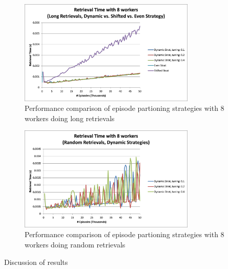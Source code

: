 \documentclass[11pt]{article} %
\begin{document}
\begin{figure}[h]
\caption{Performance comparison of episode partioning strategies with 8 workers doing long retrievals}\label{fig:longdynamcomp}
\centering
\includegraphics[width=0.75\textwidth]{images/alldynamiclong}
\end{figure}

\begin{figure}[h]
\caption{Performance comparison of episode partioning strategies with 8 workers doing random retrievals}\label{fig:randdynamcomp}
\centering
\includegraphics[width=0.75\textwidth]{images/alldynamicrand}
\end{figure}

Discussion of results
\end{document}
